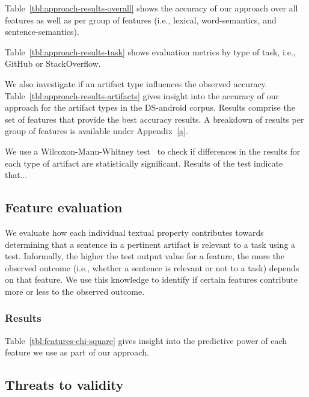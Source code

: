 Table~\ref{tbl:approach-results-overall} shows the accuracy of our approach 
over all features as well as per group of features (i.e., lexical, word-semantics, and sentence-semantics).





Table~\ref{tbl:approach-results-task} shows evaluation metrics by type of task, i.e., GitHub or StackOverflow.





We also investigate if an artifact type influences the observed accuracy. 
Table~\ref{tbl:approach-results-artifacts} gives insight into the accuracy of our approach for the artifact types in the \acs{DS-android} corpus. Results comprise the set of features 
that provide the best accuracy results. A breakdown of results per group of features is available under Appendix~\ref{a}.


We use a Wilcoxon-Mann-Whitney test~\cite{mannWhitneyU} to check if differences in the  results for each 
type of artifact are statistically significant. Results of the test indicate that... 




\subsection{Feature evaluation}


We evaluate how each individual textual property contributes towards determining 
that a sentence in a pertinent artifact is relevant to a task 
using a  test. 
Informally, the higher the test output value for a feature, the more the observed outcome (i.e., whether a sentence is relevant or not to a task) depends 
on that feature.
We use this knowledge to identify if certain features contribute more or less 
to the observed outcome.





\subsubsection{Results}



Table~\ref{tbl:features-chi-square} gives insight into the predictive power of each feature we use as part of our approach. 









\subsection{Threats to validity}


